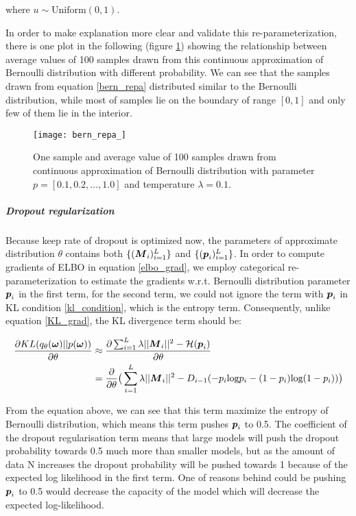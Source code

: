 where $u \sim \text{Uniform}(0,1)$. 

In order to make explanation more clear and validate this re-parameterization, there is one plot in the following (figure \ref{fig:bern_repa}) showing the relationship between average values of 100 samples drawn from this continuous approximation of Bernoulli distribution with different probability. We can see that the samples drawn from equation \ref{bern_repa} distributed similar to the Bernoulli distribution, while most of samples lie on the boundary of range $[0,1]$ and only few of them lie in the interior.
\begin{figure}[h!]
	\begin{center}
		\texttt{[image: bern\_repa\_]}
		\caption{One sample and average value of 100 samples drawn from continuous approximation of Bernoulli distribution with parameter $p = [0.1, 0.2, ..., 1.0]$ and temperature $ \lambda =0.1$.}		
		\label{fig:bern_repa}
	\end{center}
\end{figure}

\subparagraph{Dropout regularization}
Because keep rate of dropout is optimized now, the parameters of approximate distribution $\theta$ contains both $\{ (\boldsymbol M_i)_{i=1}^{L} \}$ and $\{(\boldsymbol p_i)_{i=1}^{L} \}$. In order to compute gradients of ELBO in equation \ref{elbo_grad}, we employ categorical re-parameterization to estimate the gradients w.r.t. Bernoulli distribution parameter $\boldsymbol p_i$ in the first term, for the second term, we could not ignore the term with $\boldsymbol p_i$ in KL condition \ref{kl_condition}, which is the entropy term. Consequently, unlike equation \ref{KL_grad}, the KL divergence term should be:

\begin{equation} 
\begin{aligned}\label{KL_grad_concrete}
\frac{\partial KL(q_{\theta}(\boldsymbol \omega)||p(\boldsymbol \omega))}{\partial \theta} 
&\approx \frac{\partial \sum_{i=1}^{L}\lambda||\boldsymbol M_{i}||^{2}- \mathcal H(\boldsymbol p_{i})}{\partial \theta}  \\
&= \frac{\partial}{\partial \theta} \big( \sum_{i=1}^{L}\lambda||\boldsymbol M_{i}||^{2}- D_{i-1}(-p_{i}\text{log}p_{i} - (1-p_{i})\text{log}(1-p_{i}))\big)
\end{aligned}
\end{equation}

From the equation above, we can see that this term maximize the entropy of Bernoulli distribution, which means this term pushes $\boldsymbol p_i$ to 0.5. The coefficient of the dropout regularisation term means that large models will push the dropout probability towards 0.5 much more than smaller models, but as the amount of data N increases the dropout probability will be pushed towards 1 because of the expected log likelihood in the first term. One of reasons behind could be pushing $\boldsymbol p_i$ to 0.5 would decrease the capacity of the model which will decrease the expected log-likelihood. 

